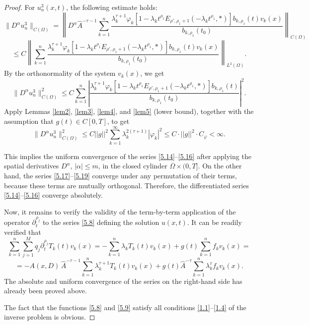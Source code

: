 \documentclass[12pt, reqno]{amsart}
\theoremstyle{definition}
\theoremstyle{remark}
\numberwithin{equation}{section}
\begin{document}
\begin{proof}
For $u_n^3(x,t)$, the following estimate holds:
\[
\| D^\alpha u_n^3 \|_{C(\Omega)}=
\left\|
D^\alpha \widehat{A}^{-\tau-1}
\sum_{k=1}^n \frac{\lambda_k^{\tau+1}\varphi_k \left[ 1 - \lambda_k t^{\rho_1} E_{ \rho', \rho_1 + 1} \left( -\lambda_k t^{\rho_1}, * \right) \right]b_{k,\rho_1}(t) v_k(x)}{b_{k,\rho_1}(t_0)}
\right\|_{C(\Omega)}
\]
\begin{equation}\label{5.19}
\le
C
\left\|
\sum_{k=1}^{n}\frac{\lambda_k^{\tau+1}\varphi_k \left[ 1 - \lambda_k t^{\rho_1} E_{ \rho', \rho_1 + 1} \left( -\lambda_k t^{\rho_1}, * \right) \right]b_{k,\rho_1}(t) v_k(x)}{b_{k,\rho_1}(t_0)}
\right\|_{L^2(\Omega)} .
\end{equation}
By the orthonormality of the system $v_k(x)$, we get
\[
\| D^\alpha u_n^3 \|_{C(\Omega)}^2
\le
C \sum_{k=1}^{n}
\left|
\frac{\lambda_k^{\tau+1}\varphi_k \left[ 1 - \lambda_k t^{\rho_1} E_{ \rho', \rho_1 + 1} \left( -\lambda_k t^{\rho_1}, * \right) \right]b_{k,\rho_1}(t)}{b_{k,\rho_1}(t_0)}
\right|^2.
\]
Apply Lemmas \ref{lem2}, \ref{lem3}, \ref{lem4}, and \ref{lem5} (lower bound), together with the assumption that $g(t)\in C[0,T]$, to get
\[
\| D^\alpha u_n^3 \|_{C(\Omega)}^2 \le
C||g||^2 \sum_{k=1}^{\infty} \lambda_k^{2(\tau+1)} |\varphi_k|^2 \le C\cdot ||g||^2\cdot C_{\varphi} < \infty.\]

This implies the uniform convergence of the series 
\eqref{5.14}--\eqref{5.16} after applying the spatial derivatives 
$D^\alpha$, $|\alpha|\le m$, in the closed cylinder 
$\overline{\Omega}\times (0,T]$.
On the other hand, the series \eqref{5.17}--\eqref{5.19} 
converge under any permutation of their terms, because these terms are mutually orthogonal. 
Therefore, the differentiated series 
\eqref{5.14}--\eqref{5.16} converge absolutely.

Now,  it remains to verify the validity of the term-by-term application of the operator
$\partial_t^{\rho_j}$ to the series \eqref{5.8} defining the solution $u(x,t)$.
It can be readily verified that 
\[
\sum_{k=1}^{n}\sum_{j=1}^M q_j \partial_t^{\rho_j}T_k(t) v_k(x)
=
- \sum_{k=1}^{n} \lambda_k T_k(t) v_k(x)
+g(t) \sum_{k=1}^{n} f_k v_k(x)=
\]
\[
=
- A(x,D)\,
\widehat{A}^{-\tau-1}
\sum_{k=1}^{n}
\lambda_k^{\tau+1} T_k(t) v_k(x)
+ g(t)\widehat{A}^{-\tau}
\sum_{k=1}^{n}
\lambda_k^{\tau} f_k v_k(x).
\]
The absolute and uniform convergence of the series on the right-hand side has already been proved above.

The fact that the functions \eqref{5.8} and \eqref{5.9} satisfy all conditions \eqref{1.1}--\eqref{1.4} of the inverse problem
is obvious.
\end{proof}
\end{document}
